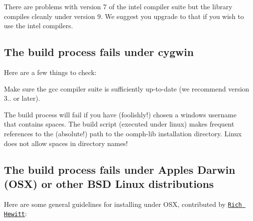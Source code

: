 There are problems with version 7 of the intel compiler suite but the library compiles cleanly under version 9. We suggest you upgrade to that if you wish to use the intel compilers.



\hypertarget{index_cygwin}{}\subsection{The build process fails under cygwin}\label{index_cygwin}
Here are a few things to check\+:
\begin{DoxyItemize}
\item Make sure the gcc compiler suite is sufficiently up-\/to-\/date (we recommend version 3.. or later). ~\newline
~\newline

\item The build process will fail if you have (foolishly!) chosen a windows username that contains spaces. The build script (executed under linux) makes frequent references to the (absolute!) path to the {\ttfamily oomph-\/lib} installation directory. Linux does not allow spaces in directory names!
\end{DoxyItemize}



\hypertarget{index_apple}{}\subsection{The build process fails under Apple\textquotesingle{}s Darwin (\+O\+S\+X) or other B\+S\+D Linux distributions}\label{index_apple}
Here are some general guidelines for installing under O\+SX, contributed by \href{http://hewitt.ddns.net/}{\tt Rich Hewitt}\+: ~\newline
~\newline

